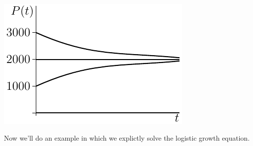 \begin{efig}
\begin{center}
   \includegraphics{pop2}
\end{center}
\end{efig}

\noindent Now we'll do an example in which we explictly solve the logistic
growth equation.

